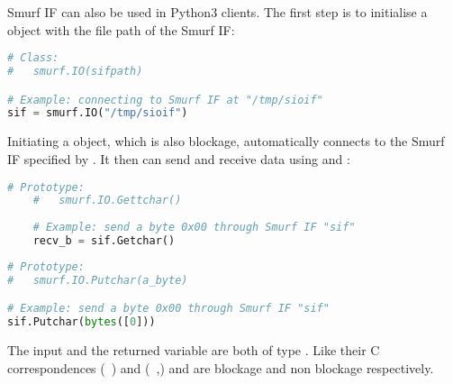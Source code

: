 Smurf IF can also be used in Python3 clients. The first step is to initialise a  object with the file path of the Smurf IF:
\begin{lstlisting}[language=Python,caption={smurf.IO\label{api:smurf.IOP}}]
# Class:
#	smurf.IO(sifpath)

# Example: connecting to Smurf IF at "/tmp/sioif"
sif = smurf.IO("/tmp/sioif")
\end{lstlisting}

Initiating a  object, which is also blockage, automatically connects to the Smurf IF specified by . It then can send and receive data using  and :
\begin{lstlisting}[language=Python,caption={smurf.IO.Getchar()\label{api:smurf.IO.Getchar}}]
	# Prototype:
	#	smurf.IO.Gettchar()
	
	# Example: send a byte 0x00 through Smurf IF "sif"
	recv_b = sif.Getchar()
\end{lstlisting}

\begin{lstlisting}[language=Python,caption={smurf.IO.Putchar()\label{api:smurf.IO.Putchar}}]
# Prototype:
#	smurf.IO.Putchar(a_byte)

# Example: send a byte 0x00 through Smurf IF "sif"
sif.Putchar(bytes([0]))
\end{lstlisting}

The input  and the returned variable  are both of type . Like their C correspondences (~) and (~,)  and  are blockage and non blockage respectively.